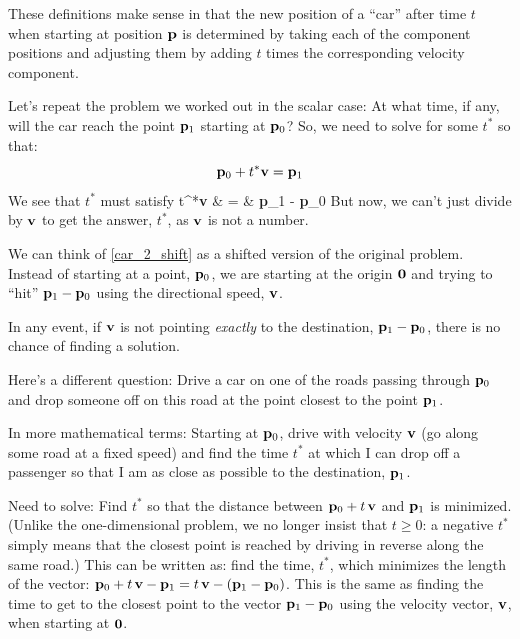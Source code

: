 \documentclass[12pt]{article}
\begin{document}
These definitions make sense in that the new position of a ``car'' after time 
$t$ when starting at position ${\bf p}$ is determined by taking each of the 
component positions and adjusting them by adding $t$ times the
corresponding velocity component.

Let's repeat the problem we worked out in the scalar case:
At what time, if any, will the car reach the point ${\bf p}_1$ starting at ${\bf p}_0$?
So, we need to solve for some $t^*$ so that: 
$${\bf p}_0 + t^* {\bf v} = {\bf p}_1$$
We see that $t^*$ must satisfy
\be 
	t^*{\bf v} & = & {\bf p}_1 - {\bf p}_0 \label{car_2_shift}
\ee
But now, we can't just divide by ${\bf v}$ to get the answer, $t^*$, 
as ${\bf v}$ is not a number.

We can think of \eqref{car_2_shift} as a shifted version of the
original problem. Instead of starting at a point, ${\bf p}_0$, we are starting at
the origin ${\bf 0}$ and trying to ``hit'' ${\bf p}_1 - {\bf p}_0$ using the
directional speed, ${\bf v}$.

In any event, if ${\bf v}$ is not pointing {\em exactly\/} to the destination, 
${\bf p}_1 - {\bf p}_0$, there is no chance of finding a solution.

Here's a different question: Drive a car on one of the roads passing through 
${\bf p}_0$ and drop someone off on this road at the point closest to the  
point ${\bf p}_1$. 

In more mathematical terms: Starting at ${\bf p}_0$, drive with velocity 
${\bf v}$ (go along some road at a fixed speed) and find the time $t^*$ at 
which I can drop off a passenger so that I am as close as possible to the 
destination, ${\bf p}_1$. 

Need to solve: Find $t^*$ so that the distance between 
${\bf p}_0 + t \, {\bf v}$ and ${\bf p}_1$ is minimized.
(Unlike the one-dimensional problem, we no longer insist that $t \ge 0$:
a negative $t^*$ simply means that the closest point is reached by driving
in reverse along the same road.)
This can be written as: find the time, $t^*$, which minimizes the length of the
vector:
${\bf p}_0 + t\, {\bf v} - {\bf p}_1 =  t \, {\bf v} - ({\bf p}_1 - {\bf p}_0)$.
This is the same as finding the time to get to the closest point to the 
vector ${\bf p}_1 - {\bf p}_0$ using the velocity vector, ${\bf v}$, 
when starting at ${\bf 0}$.
\end{document}
